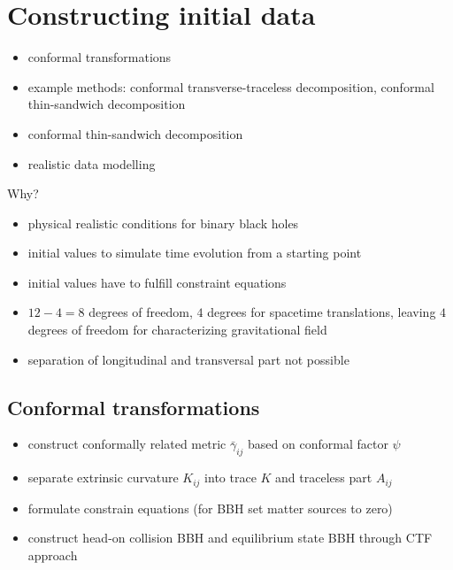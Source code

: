 \documentclass[twocolumn]{article}
\begin{document}
  \section{Constructing initial data} %
  \label{sec:constructing_initial_data}
    \begin{itemize}
      \item conformal transformations
      \item example methods: conformal transverse-traceless decomposition, conformal thin-sandwich decomposition
      \item conformal thin-sandwich decomposition
      \item realistic data modelling
    \end{itemize}

    Why?
    \begin{itemize}
      \item physical realistic conditions for binary black holes
    \end{itemize}

    \begin{itemize}
      \item initial values to simulate time evolution from a starting point
      \item initial values have to fulfill constraint equations
      \item $12-4 = 8$ degrees of freedom, $4$ degrees for spacetime translations, leaving $4$ degrees of freedom for characterizing gravitational field
      \item separation of longitudinal and transversal part not possible
    \end{itemize}

    \subsection{Conformal transformations} %
    \label{sub:conformal_transformations}
      \begin{itemize}
        \item construct conformally related metric $\bar{γ}_{ij}$ based on conformal factor $ψ$
        \item separate extrinsic curvature $K_{ij}$ into trace $K$ and traceless part $A_{ij}$
        \item formulate constrain equations (for BBH set matter sources to zero)
        \item construct head-on collision BBH and equilibrium state BBH through CTF approach
      \end{itemize}
\end{document}
